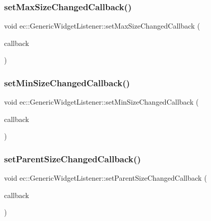 \subsubsection{\texorpdfstring{set\+Max\+Size\+Changed\+Callback()}{setMaxSizeChangedCallback()}}
{\footnotesize\ttfamily void ec\+::\+Generic\+Widget\+Listener\+::set\+Max\+Size\+Changed\+Callback (\begin{DoxyParamCaption}\item[{const \mbox{\hyperlink{classec_1_1_generic_widget_listener_aa7b919052f00bb1241477c3681ddf06b}{Max\+Size\+Changed\+\_\+\+Callback}} \&}]{callback }\end{DoxyParamCaption})}

\mbox{\label{classec_1_1_generic_widget_listener_af3704b6d810f1786062e452ffec1f643}} 
\subsubsection{\texorpdfstring{set\+Min\+Size\+Changed\+Callback()}{setMinSizeChangedCallback()}}
{\footnotesize\ttfamily void ec\+::\+Generic\+Widget\+Listener\+::set\+Min\+Size\+Changed\+Callback (\begin{DoxyParamCaption}\item[{const \mbox{\hyperlink{classec_1_1_generic_widget_listener_a3a7f28218f30331b12bc00d05f4bc34f}{Min\+Size\+Changed\+\_\+\+Callback}} \&}]{callback }\end{DoxyParamCaption})}

\mbox{\label{classec_1_1_generic_widget_listener_aaa4ba3b0f552b8b55d02fb8d20fa13e6}} 
\subsubsection{\texorpdfstring{set\+Parent\+Size\+Changed\+Callback()}{setParentSizeChangedCallback()}}
{\footnotesize\ttfamily void ec\+::\+Generic\+Widget\+Listener\+::set\+Parent\+Size\+Changed\+Callback (\begin{DoxyParamCaption}\item[{const \mbox{\hyperlink{classec_1_1_generic_widget_listener_acf92a781f3b2f06053cd1c100b6763d3}{Parent\+Size\+Changed\+\_\+\+Callback}} \&}]{callback }\end{DoxyParamCaption})}


